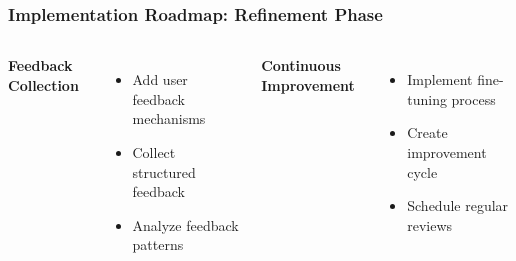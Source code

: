 \begin{frame}
    \frametitle{Implementation Roadmap: Refinement Phase}
    
    \begin{center}
    \end{center}
    
    \begin{columns}
        \textbf{Feedback Collection}
        \begin{itemize}
            \item Add user feedback mechanisms
            \item Collect structured feedback
            \item Analyze feedback patterns
        \end{itemize}
        
        \textbf{Continuous Improvement}
        \begin{itemize}
            \item Implement fine-tuning process
            \item Create improvement cycle
            \item Schedule regular reviews
        \end{itemize}
    \end{columns}
    
    \vspace{0.3cm}
    \begin{center}
    \end{center}
\end{frame}

